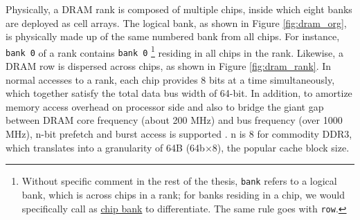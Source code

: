Physically, a DRAM rank is composed of multiple chips, inside which eight banks are deployed as cell arrays.
The logical bank, as shown in Figure \ref{fig:dram_org}, is physically made up of the same numbered bank from all chips.
For instance, {\tt bank 0} of a rank contains {\tt bank 0} 
\footnote{Without specific comment in the rest of the thesis, {\tt bank} refers to a logical bank, which is across chips in a rank; for banks residing in a chip, we would specifically call as \ul{chip bank} to differentiate. The same rule goes with {\tt row}.}
residing in all chips in the rank. 
Likewise, a DRAM row is dispersed across chips, as shown in Figure \ref{fig:dram_rank}. 
In normal accesses to a rank, each chip provides 8 bits at a time simultaneously, which together satisfy the total data bus width of 64-bit.
In addition, to amortize memory access overhead on processor side and also to bridge the giant gap between DRAM core frequency (about 200 MHz) and bus frequency (over 1000 MHz), n-bit prefetch and burst access is supported \cite{ISCA11:agms, ISCA14:half_dram}. n is 8 for commodity DDR3, which translates into a granularity of 64B (64b$\times$8), the popular cache block size. 

